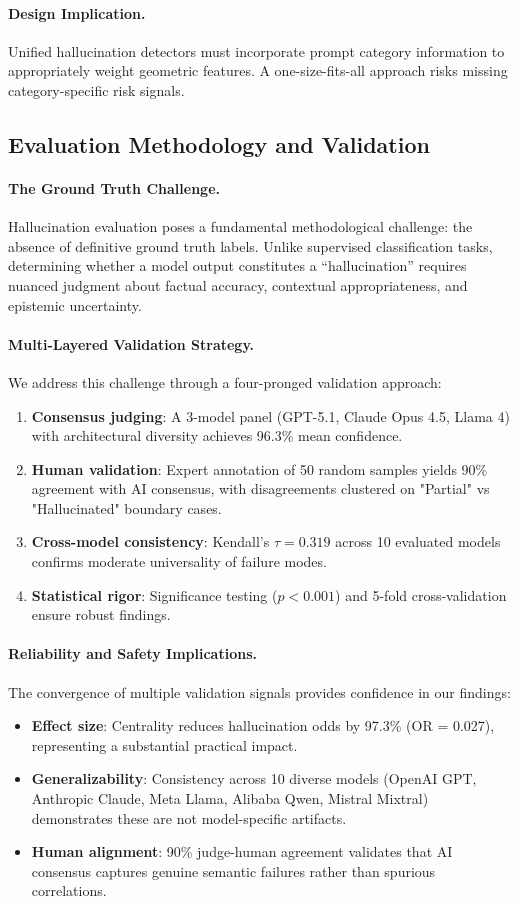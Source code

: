 \documentclass{article}
\begin{document}
\paragraph{Design Implication.}
Unified hallucination detectors must incorporate prompt category information to appropriately weight geometric features. A one-size-fits-all approach risks missing category-specific risk signals.
\subsection{Evaluation Methodology and Validation}
\paragraph{The Ground Truth Challenge.}
Hallucination evaluation poses a fundamental methodological challenge: the absence of definitive ground truth labels. Unlike supervised classification tasks, determining whether a model output constitutes a ``hallucination'' requires nuanced judgment about factual accuracy, contextual appropriateness, and epistemic uncertainty.
\paragraph{Multi-Layered Validation Strategy.}
We address this challenge through a four-pronged validation approach:
\begin{enumerate}
    \item \textbf{Consensus judging}: A 3-model panel (GPT-5.1, Claude Opus 4.5, Llama 4) with architectural diversity achieves 96.3\% mean confidence.
    \item \textbf{Human validation}: Expert annotation of 50 random samples yields 90\% agreement with AI consensus, with disagreements clustered on "Partial" vs "Hallucinated" boundary cases.

    \item \textbf{Cross-model consistency}: Kendall's $\tau = 0.319$ across 10 evaluated models confirms moderate universality of failure modes.
    \item \textbf{Statistical rigor}: Significance testing ($p<0.001$) and 5-fold cross-validation ensure robust findings.
\end{enumerate}
\paragraph{Reliability and Safety Implications.}
The convergence of multiple validation signals provides confidence in our findings:
\begin{itemize}
    \item \textbf{Effect size}: Centrality reduces hallucination odds by 97.3\% (OR = 0.027), representing a substantial practical impact.
    \item \textbf{Generalizability}: Consistency across 10 diverse models (OpenAI GPT, Anthropic Claude, Meta Llama, Alibaba Qwen, Mistral Mixtral) demonstrates these are not model-specific artifacts.
    \item \textbf{Human alignment}: 90\% judge-human agreement validates that AI consensus captures genuine semantic failures rather than spurious correlations.
\end{itemize}
\end{document}
